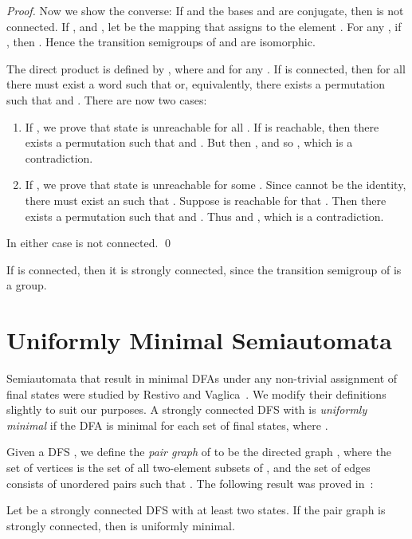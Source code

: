 \documentclass{llncs}
\newcommand{\be}{\begin{enumerate}}
\newcommand{\ee}{\end{enumerate}}
\begin{document}
\begin{proof}
 Now we show the converse: If  and the bases  and  are conjugate, then  is not connected.
If  , and  , 
let  be the mapping that assigns to   the element 
.
For any , if , then 
.
Hence  the transition semigroups of  and  are isomorphic.

The direct product  is defined by , where   and
 for any .  If  is connected, then for all  there must exist a word  such that
 or, equivalently, there exists a permutation
 such that  and . 
There are now two cases:
\be 
\item
If , we prove that state  is unreachable for all .
If  is reachable, then there exists a permutation  such that
 and . But then , and so
, which is a contradiction.
\item
If , we prove that state  is unreachable for some .
Since  cannot be the identity, there must exist an  such 
that . Suppose  is reachable for that .
Then there exists a permutation
 such that  and . 
Thus  and 
, which is a contradiction.
\ee

In either case    is not connected. 
\qed
\end{proof}

\begin{remark}
\label{rem:sc}
If  is connected, then it is strongly connected, since the transition semigroup of  is a group.
\end{remark}

\section{Uniformly Minimal Semiautomata}
\label{sec:uniform}
Semiautomata that result in minimal DFAs under any non-trivial assignment of final states were studied by Restivo and Vaglica~\cite{ReVa12}.
We modify their definitions slightly to suit our purposes.
A strongly connected DFS  with  is \emph{uniformly minimal}
if the DFA  is minimal for each set  of final states, where .

Given a DFS , we define the \emph{pair graph}
of  to be the directed graph , where the set  of vertices  is the set of all two-element subsets  of , and the set  of edges consists of unordered pairs  such that 
.
The following result was proved in~\cite{ReVa12}:

\begin{proposition}
\label{prop:Restivo}
Let  be a strongly connected DFS with at least two states. If the pair graph
 is strongly connected, then  is uniformly minimal.
\end{proposition}
\end{document}
